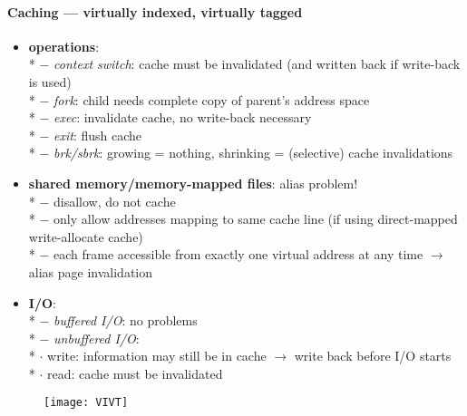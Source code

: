 \paragraph{Caching --- virtually indexed, virtually tagged}
\begin{itemize}
  \item \textbf{operations}: \\*
    $ - $ \emph{context switch}: cache must be invalidated (and written back if write-back is used) \\*
    $ - $ \emph{fork}: child needs complete copy of parent's address space \\*
    $ - $ \emph{exec}: invalidate cache, no write-back necessary \\*
    $ - $ \emph{exit}: flush cache \\*
    $ - $ \emph{brk/sbrk}: growing = nothing, shrinking = (selective) cache invalidations
  \item \textbf{shared memory/memory-mapped files}: alias problem! \\*
    $ - $ disallow, do not cache \\*
    $ - $ only allow addresses mapping to same cache line (if using direct-mapped write-allocate cache) \\*
    $ - $ each frame accessible from exactly one virtual address at any time $ \to $ alias page invalidation
  \item \textbf{I/O}: \\*
    $ - $ \emph{buffered I/O}: no problems \\*
    $ - $ \emph{unbuffered I/O}: \\*
      \phantom{$ - $} $ \cdot $ write: information may still be in cache $ \to $ write back before I/O starts \\*
      \phantom{$ - $} $ \cdot $ read: cache must be invalidated
\end{itemize}
\begin{figure}[h]\centering\label{VIVT}\texttt{[image: VIVT]}\end{figure}

